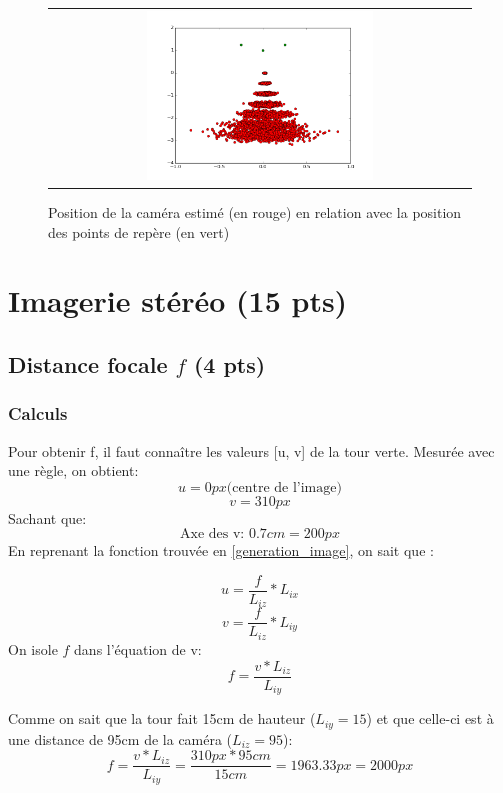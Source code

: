 \documentclass[12pt]{article}
\begin{document}
\begin{figure}[ht]
 \begin{center}
  \begin{tabular}{c}
    \includegraphics[width=0.55\textwidth]{q2-bruit-pose.png}
  \end{tabular}
 \end{center}
\vspace{-0.25in}
    \caption{Position de la caméra estimé (en rouge) en relation avec la position des points de repère (en vert)}
    \label{impact-bruit-camera}
\end{figure}

\newpage
\section{Imagerie stéréo  (15 pts)}

\subsection{Distance focale $f$ (4 pts)}
\subsubsection{Calculs}
Pour obtenir f, il faut connaître les valeurs [u, v] de la tour verte.
Mesur\'ee avec une r\`egle, on obtient:
\[ u = 0 px \text{(centre de l'image)}\]
\[ v = 310 px\]
Sachant que:
\[ \text{Axe des v: } 0.7cm = 200px \]
En reprenant la fonction trouv\'ee en \ref{generation_image}, on sait que :

\[
    u =  \frac{f}{L_{iz}} * L_{ix}
\]
\[
    v =  \frac{f}{L_{iz}} * L_{iy}
\]
On isole $f$ dans l'\'equation de v:
\[
    f =  \frac{v * L_{iz}}{L_{iy}}
\]

Comme on sait que la tour fait 15cm de hauteur ($L_{iy} = 15$) et que celle-ci est \`a une distance de 95cm de la cam\'era ($L_{iz} = 95$):
\[
    f =  \frac{v * L_{iz}}{L_{iy}} = \frac{310px * 95 cm}{15cm} = 1963.33 px = 2000 px
\]
\end{document}
